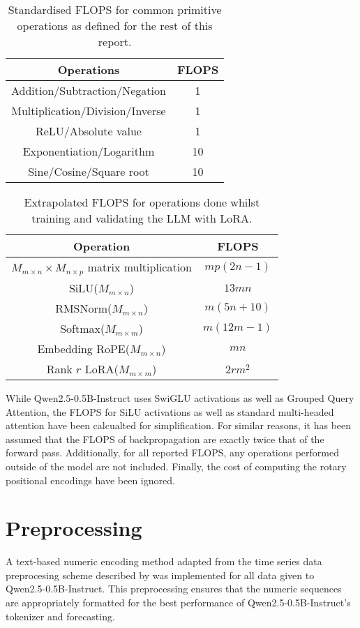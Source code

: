 \documentclass[11pt,a4paper]{article}
\begin{document}
\begin{table}[h]
    \centering
    \begin{tabular}{c|c}
        Operations & FLOPS \\
        \hline
        Addition/Subtraction/Negation & 1 \\
        Multiplication/Division/Inverse & 1 \\
        ReLU/Absolute value & 1 \\
        Exponentiation/Logarithm & 10\\
        Sine/Cosine/Square root & 10 \\
        
    \end{tabular}
    \caption{Standardised FLOPS for common primitive operations as defined for the rest of this report.}
    \label{tab:flops_primitives}
\end{table}

\begin{table}
    \centering
    \begin{tabular}{c|c}
        Operation & FLOPS \\
        \hline
        $M_{m \times n} \times M_{n \times p}$ matrix multiplication & $mp(2n-1)$\\
        SiLU($M_{m \times n}$)& $13mn$ \\
        RMSNorm($M_{m \times n}$) & $m(5n + 10)$ \\
        Softmax($M_{m \times m}$) & $m(12m-1)$\\
        Embedding RoPE($M_{m \times n}$) & $mn$ \\ 
        Rank $r$ LoRA($M_{m \times m}$) & $2rm^2$
    \end{tabular}
    \caption{Extrapolated FLOPS for operations done whilst training and validating the LLM with LoRA.}
    \label{tab:flops_advanced}
\end{table}
While Qwen2.5-0.5B-Instruct uses SwiGLU activations as well as Grouped Query Attention, the FLOPS for SiLU activations as well as standard multi-headed attention have been calcualted for simplification. For similar reasons, it has been assumed that the FLOPS of backpropagation are exactly twice that of the forward pass. Additionally, for all reported FLOPS, any operations performed outside of the model are not included. Finally, the cost of computing the rotary positional encodings have been ignored.

\section{Preprocessing}
\label{zero}
A text-based numeric encoding method adapted from the time series data preprocesing scheme described by \citeauthor{gruver2024largelanguagemodelszeroshot} was implemented for all data given to Qwen2.5-0.5B-Instruct. This preprocessing ensures that the numeric sequences are appropriately formatted for the best performance of Qwen2.5-0.5B-Instruct's tokenizer and forecasting.
\end{document}
